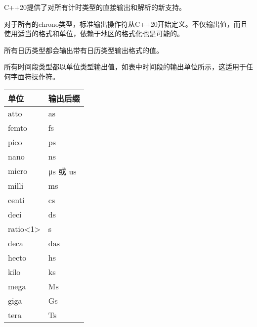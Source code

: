 
C++20提供了对所有计时类型的直接输出和解析的新支持。


对于所有的chrono类型，标准输出操作符从C++20开始定义。不仅输出值，而且使用适当的格式和单位，依赖于地区的格式化也是可能的。

所有日历类型都会输出带有日历类型输出格式的值。

所有时间段类型都以单位类型输出值，如表中时间段的输出单位所示，这适用于任何字面符操作符。

\begin{longtable}[c]{|l|l|}
\hline
\textbf{单位}                          & \textbf{输出后缀} \\ \hline
\endfirsthead
%
\endhead
%
atto                                   & as                     \\ \hline
femto                                  & fs                     \\ \hline
pico                                   & ps                     \\ \hline
nano                                   & ns                     \\ \hline
micro                                  & μs 或 us               \\ \hline
milli                                  & ms                     \\ \hline
centi                                  & cs                     \\ \hline
deci                                   & ds                     \\ \hline
ratio\textless{}1\textgreater{}        & s                      \\ \hline
deca                                   & das                    \\ \hline
hecto                                  & hs                     \\ \hline
kilo                                   & ks                     \\ \hline
mega                                   & Ms                     \\ \hline
giga                                   & Gs                     \\ \hline
tera                                   & Ts                     \\ \hline

\end{longtable}

